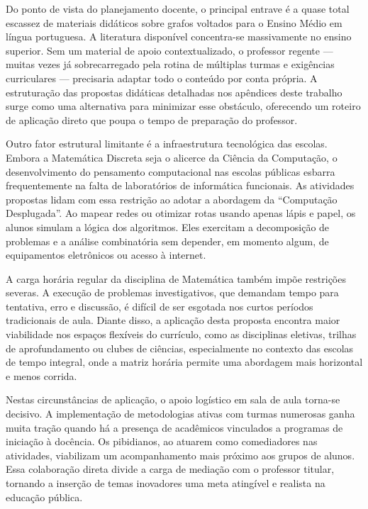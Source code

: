 \documentclass[
  12pt,
  oneside,
  a4paper,
  english,
  brazilian
  ]{abntex2}
\theoremstyle{definition}
\begin{document}
Do ponto de vista do planejamento docente, o principal entrave é a quase total escassez de materiais didáticos sobre grafos voltados para o Ensino Médio em língua portuguesa. A literatura disponível concentra-se massivamente no ensino superior. Sem um material de apoio contextualizado, o professor regente --- muitas vezes já sobrecarregado pela rotina de múltiplas turmas e exigências curriculares --- precisaria adaptar todo o conteúdo por conta própria. A estruturação das propostas didáticas detalhadas nos apêndices deste trabalho surge como uma alternativa para minimizar esse obstáculo, oferecendo um roteiro de aplicação direto que poupa o tempo de preparação do professor.

Outro fator estrutural limitante é a infraestrutura tecnológica das escolas. Embora a Matemática Discreta seja o alicerce da Ciência da Computação, o desenvolvimento do pensamento computacional nas escolas públicas esbarra frequentemente na falta de laboratórios de informática funcionais. As atividades propostas lidam com essa restrição ao adotar a abordagem da ``Computação Desplugada''. Ao mapear redes ou otimizar rotas usando apenas lápis e papel, os alunos simulam a lógica dos algoritmos. Eles exercitam a decomposição de problemas e a análise combinatória sem depender, em momento algum, de equipamentos eletrônicos ou acesso à internet.

A carga horária regular da disciplina de Matemática também impõe restrições severas. A execução de problemas investigativos, que demandam tempo para tentativa, erro e discussão, é difícil de ser esgotada nos curtos períodos tradicionais de aula. Diante disso, a aplicação desta proposta encontra maior viabilidade nos espaços flexíveis do currículo, como as disciplinas eletivas, trilhas de aprofundamento ou clubes de ciências, especialmente no contexto das escolas de tempo integral, onde a matriz horária permite uma abordagem mais horizontal e menos corrida.

Nestas circunstâncias de aplicação, o apoio logístico em sala de aula torna-se decisivo. A implementação de metodologias ativas com turmas numerosas ganha muita tração quando há a presença de acadêmicos vinculados a programas de iniciação à docência. Os pibidianos, ao atuarem como comediadores nas atividades, viabilizam um acompanhamento mais próximo aos grupos de alunos. Essa colaboração direta divide a carga de mediação com o professor titular, tornando a inserção de temas inovadores uma meta atingível e realista na educação pública.

\end{document}
